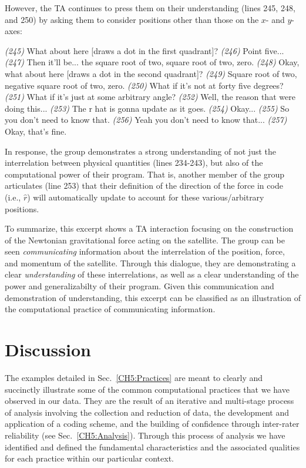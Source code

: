 \documentclass{msuphddissertation}
\begin{document}
\begin{doublespace}
However, the TA continues to press them on their understanding (lines 245, 248, and 250) by asking them to consider positions other than those on the $x$- and $y$-axes: \begin{description}
\TA \textit{(245)} What about here [draws a dot in the first quadrant]?
\SD \textit{(246)} Point five...
\SB \textit{(247)} Then it'll be... the square root of two, square root of two, zero.
\TA \textit{(248)} Okay, what about here [draws a dot in the second quadrant]?
\SB \textit{(249)} Square root of two, negative square root of two, zero.
\TA \textit{(250)} What if it's not at forty five degrees?
\TA \textit{(251)} What if it's just at some arbitrary angle?
\SB \textit{(252)} Well, the reason that were doing this...			
\SD \textit{(253)} The r hat is gonna update as it goes.
\TA \textit{(254)} Okay...
\SD \textit{(255)} So you don’t need to know that.
\SB \textit{(256)} Yeah you don’t need {to know that}...		
\TA \textit{(257)} Okay, that’s fine.
\end{description}  In response, the group demonstrates a strong understanding of not just the interrelation between physical quantities (lines 234-243), but also of the computational power of their program.  That is, another member of the group articulates (line 253) that their definition of the direction of the force in code (i.e., $\hat{r}$) will automatically update to account for these various/arbitrary positions.

To summarize, this excerpt shows a TA interaction focusing on the construction of the Newtonian gravitational force acting on the satellite.  The group can be seen \textit{communicating} information about the interrelation of the position, force, and momentum of the satellite.  Through this dialogue, they are demonstrating a clear \textit{understanding} of these interrelations, as well as a clear understanding of the power and generalizabilty of their program.  Given this communication and demonstration of understanding, this excerpt can be classified as an illustration of the computational practice of communicating information.

%
%

\chapter{Discussion}\label{CH6:Discussion}

The examples detailed in Sec.~\ref{CH5:Practices} are meant to clearly and succinctly illustrate some of the common computational practices that we have observed in our data.  They are the result of an iterative and multi-stage process of analysis involving the collection and reduction of data, the development and application of a coding scheme, and the building of confidence through inter-rater reliability (see Sec.~\ref{CH5:Analysis}).  Through this process of analysis we have identified and defined the fundamental characteristics and the associated qualities for each practice within our particular context.


\end{doublespace}
\end{document}
